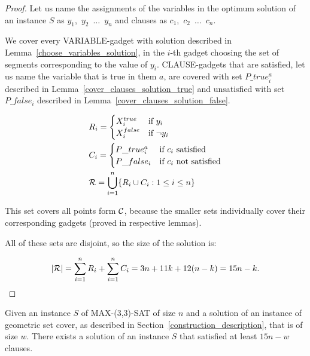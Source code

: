 \begin{proof}
Let us name the assignments of the variables in
the optimum solution of an instance $S$ as
$y_1$,~$y_2$~$\ldots$~$y_n$ and clauses as
$c_1$,~$c_2$~$\ldots$~$c_n$.


We cover every VARIABLE-gadget with solution described in
Lemma~\ref{choose_variables_solution},
in the $i$-th gadget choosing the set of segments corresponding to the
value of $y_i$. 
CLAUSE-gadgets that are satisfied,
let us name the variable that is true in them $a$,
are covered with set $P\_true_i^a$ described in
Lemma~\ref{cover_clauses_solution_true}
and unsatisfied with set $P\_false_i$ described in
Lemma~\ref{cover_clauses_solution_false}.


\begin{align}
	\begin{split}
	& R_i = \begin{cases}
		X_i^{true} & \text{if}\ y_i \\
		X_i^{false} & \text{if}\ \neg y_i
		\end{cases} \\
	& C_i = \begin{cases}
		P\_true_i^a & \text{if}\ c_i \text{ satisfied} \\
		P\_false_i & \text{if}\ c_i \text{ not satisfied}
		\end{cases} \\
	& \mathcal{R} = \bigcup\limits_{i=1}^{n} \{R_i \cup C_i : 1 \le i \le n\}
    \end{split}
\end{align}


This set covers all points form $\mathcal{C}$, because
the smaller sets individually cover their corresponding gadgets
(proved in respective lemmas).

All of these sets are disjoint, so the size of the solution is:

$$|\mathcal{R}| = \sum_{i=1}^{n} R_i + \sum_{i=1}^n C_i = 3n + 11k + 12(n-k) = 15n - k.$$

\end{proof}
\begin{lemma}
	\label{construction_completness}
	Given an instance $S$ of MAX-(3,3)-SAT of size $n$
	and a solution of an instance of geometric set cover,
	as described in Section~\ref{construction_description},
	that is of size $w$.
	There exists a solution of an instance $S$
	that satisfied at least $15n - w$ clauses.
\end{lemma}

